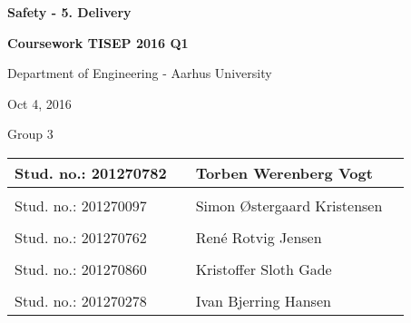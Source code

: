 
\centerline{\Huge\bfseries\color{ThemeColor}Safety  - 5. Delivery}

\vspace{1em}
\centerline{\Large\bfseries\color{BlackColor} Coursework TISEP 2016 Q1}



\vspace{5em}
\centerline{\large\bfseries\color{BlackColor}}
\centerline{\large\color{BlackColor}Department of Engineering - Aarhus University}

\vspace{0.5em}
\centerline{\large\color{BlackColor} Oct 4, 2016}

\vspace{0.5em}
\centerline{\large\color{BlackColor} Group 3}

\vspace{25em}

\begin{center}
   \begin{tabular}{ l p{3cm} l l }
   Stud. no.: 201270782 && Torben Werenberg Vogt & \\\hline
   & & \\
   Stud. no.: 201270097 && Simon Østergaard Kristensen & \\\hline
   & & \\
   Stud. no.: 201270762 && René Rotvig Jensen & \\\hline
   & & \\
   Stud. no.: 201270860 && Kristoffer Sloth Gade & \\\hline
   & & \\
   Stud. no.: 201270278 &&  Ivan Bjerring Hansen & \\\hline
   \end{tabular}
\end{center}
\thispagestyle{empty} %
\restoregeometry

